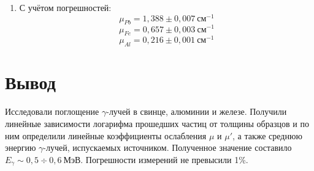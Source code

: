\documentclass{physlab}
\begin{document}
\begin{enumerate}
\begin{enumerate}
        \item С учётом погрешностей:
        \[ \mu_{Pb} = 1,388 \pm 0,007 ~\text{см}^{-1} \]
        \[ \mu_{Fe} = 0,657 \pm 0,003 ~\text{см}^{-1} \]
        \[ \mu_{Al} = 0,216 \pm 0,001 ~\text{см}^{-1} \]
	\end{enumerate}
		
\end{enumerate}
		
\section{Вывод} Исследовали поглощение $\gamma$-лучей в свинце, алюминии и железе. Получили линейные зависимости логарифма прошедших частиц от толщины образцов и по ним определили линейные коэффициенты ослабления $\mu$ и $\mu'$, а также среднюю энергию $\gamma$-лучей, испускаемых источником.  Полученное значение составило $E_{\gamma} \sim 0,5\div0,6 ~\text{МэВ}$. Погрешности измерений не превысили 1\%.
\end{document}
